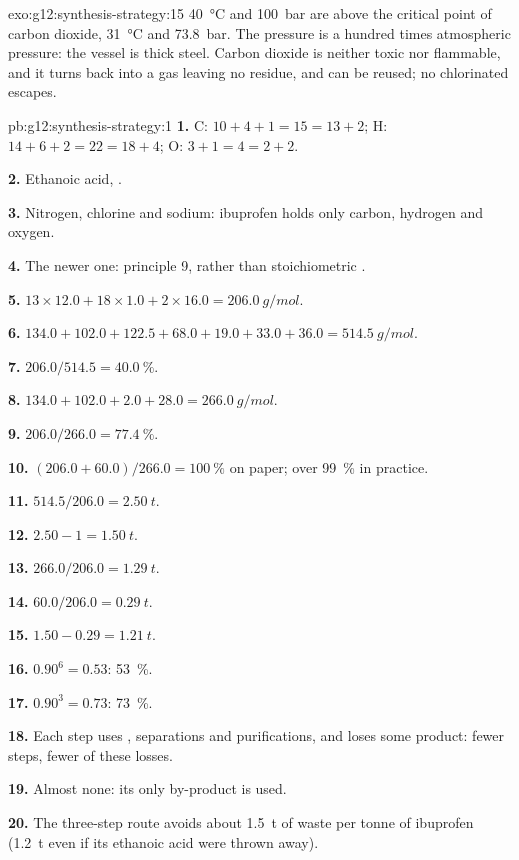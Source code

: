 \begin{solution}{exo:g12:synthesis-strategy:15}
\qty{40}{\celsius} and \qty{100}{bar} are above the critical point of
carbon dioxide, \qty{31}{\celsius} and \qty{73.8}{bar}. The pressure is a
hundred times atmospheric pressure: the vessel is thick steel. Carbon
dioxide is neither toxic nor flammable, and it turns back into a gas
leaving no residue, and can be reused; no chlorinated  escapes.
\end{solution}

\begin{solution}{pb:g12:synthesis-strategy:1}
\textbf{1.} C: $10 + 4 + 1 = 15 = 13 + 2$; H: $14 + 6 + 2 = 22 = 18 + 4$;
O: $3 + 1 = 4 = 2 + 2$.

\textbf{2.} Ethanoic acid, .

\textbf{3.} Nitrogen, chlorine and sodium: ibuprofen holds only carbon,
hydrogen and oxygen.

\textbf{4.} The newer one: principle 9,  rather than
stoichiometric .

\textbf{5.} $13 \times 12.0 + 18 \times 1.0 + 2 \times 16.0 =
\qty{206.0}{g/mol}$.

\textbf{6.} $134.0 + 102.0 + 122.5 + 68.0 + 19.0 + 33.0 + 36.0 =
\qty{514.5}{g/mol}$.

\textbf{7.} $206.0/514.5 = \qty{40.0}{\percent}$.

\textbf{8.} $134.0 + 102.0 + 2.0 + 28.0 = \qty{266.0}{g/mol}$.

\textbf{9.} $206.0/266.0 = \qty{77.4}{\percent}$.

\textbf{10.} $(206.0 + 60.0)/266.0 = \qty{100}{\percent}$ on paper; over
\qty{99}{\percent} in practice.

\textbf{11.} $514.5/206.0 = \qty{2.50}{t}$.

\textbf{12.} $2.50 - 1 = \qty{1.50}{t}$.

\textbf{13.} $266.0/206.0 = \qty{1.29}{t}$.

\textbf{14.} $60.0/206.0 = \qty{0.29}{t}$.

\textbf{15.} $1.50 - 0.29 = \qty{1.21}{t}$.

\textbf{16.} $0.90^6 = 0.53$: \qty{53}{\percent}.

\textbf{17.} $0.90^3 = 0.73$: \qty{73}{\percent}.

\textbf{18.} Each step uses , separations and purifications, and
loses some product: fewer steps, fewer of these losses.

\textbf{19.} Almost none: its only by-product is used.

\textbf{20.} The three-step route avoids about \qty{1.5}{t} of waste per
tonne of ibuprofen (\qty{1.2}{t} even if its ethanoic acid were thrown
away).
\end{solution}
